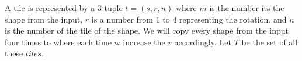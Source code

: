 \documentclass{../base/base}
\begin{document}
A tile is represented by a 3-tuple $t = (s, r, n)$ where $m$ is the number its the shape from the input, $r$ is a number from $1$ to $4$ representing the rotation. and $n$ is the number of the tile of the shape.
We will copy every shape from the input four times to where each time w increase the $r$ accordingly.
Let $T$ be the set of all these $tiles$.
\begin{comment}

Now we can define a Variable stating if a field is occupied by a tile:
$$X_{c,s} = X_{(x,y),(s,r,n)}$$

To formulate all constraints we need to extend the workspace form the excersise. The input is a workspace of dimensions $w \cdot h$, with $h$ beeing the axis that can extend and w the width. No tile may be placed outside of the width.

First, we copy another workspace directly beneath the current workspace. This results in the height to double: $h := h \cdot 2$
Let $F2$ be the set of the added fields, while $F1$ is the set of fields that existeed before. And let $F = F1 \cup F2$

Second, we add another column on each side. The new width is $h := h+2$. We will use these fields to ensure that they are not \textit{painted} with e tile. Let $O$ be the set of these fields.

With $h=3,w=2$ the field looks like this. The blue fields are in $O$, the yellow fields are in $F1$ and the orange fields are $F2$ \\

\end{comment}
\end{document}
